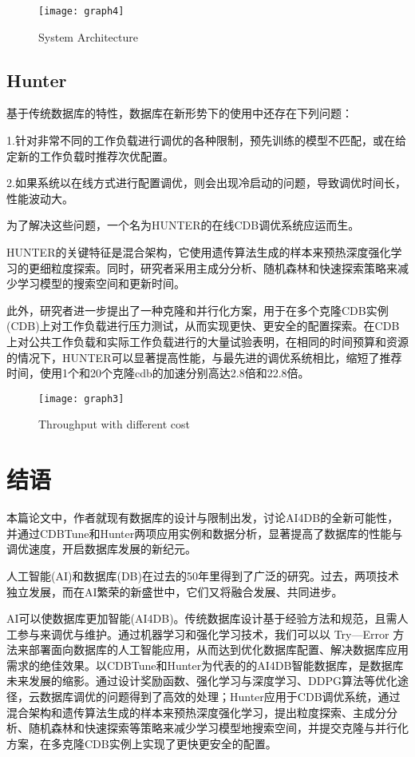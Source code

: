 \documentclass[a4paper,12pt]{article}
\begin{document}
\begin{figure}
\centering
\texttt{[image: graph4]}
\caption{System Architecture\cite{05}}
\end{figure}
\subsection{Hunter}
基于传统数据库的特性，数据库在新形势下的使用中还存在下列问题：

1.针对非常不同的工作负载进行调优的各种限制，预先训练的模型不匹配，或在给定新的工作负载时推荐次优配置。

2.如果系统以在线方式进行配置调优，则会出现冷启动的问题，导致调优时间长，性能波动大。

为了解决这些问题，一个名为HUNTER的在线CDB调优系统应运而生。

HUNTER的关键特征是混合架构，它使用遗传算法生成的样本来预热深度强化学习的更细粒度探索。同时，研究者采用主成分分析、随机森林和快速探索策略来减少学习模型的搜索空间和更新时间。

此外，研究者进一步提出了一种克隆和并行化方案，用于在多个克隆CDB实例(CDB)上对工作负载进行压力测试，从而实现更快、更安全的配置探索。在CDB上对公共工作负载和实际工作负载进行的大量试验表明，在相同的时间预算和资源的情况下，HUNTER可以显著提高性能，与最先进的调优系统相比，缩短了推荐时间，使用1个和20个克隆cdb的加速分别高达2.8倍和22.8倍\cite{04}。

\begin{figure}
\centering
\texttt{[image: graph3]}
\caption{Throughput with different cost\cite{04}}
\end{figure}

\section{结语}
本篇论文中，作者就现有数据库的设计与限制出发，讨论AI4DB的全新可能性，并通过CDBTune和Hunter两项应用实例和数据分析，显著提高了数据库的性能与调优速度，开启数据库发展的新纪元。

人工智能(AI)和数据库(DB)在过去的50年里得到了广泛的研究。过去，两项技术独立发展，而在AI繁荣的新盛世中，它们又将融合发展、共同进步。

AI可以使数据库更加智能(AI4DB)。传统数据库设计基于经验方法和规范，且需人工参与来调优与维护。通过机器学习和强化学习技术，我们可以以 Try—Error 方法来部署面向数据库的人工智能应用，从而达到优化数据库配置、解决数据库应用需求的绝佳效果。以CDBTune和Hunter为代表的的AI4DB智能数据库，是数据库未来发展的缩影。通过设计奖励函数、强化学习与深度学习、DDPG算法等优化途径，云数据库调优的问题得到了高效的处理；Hunter应用于CDB调优系统，通过混合架构和遗传算法生成的样本来预热深度强化学习，提出粒度探索、主成分分析、随机森林和快速探索等策略来减少学习模型地搜索空间，并提交克隆与并行化方案，在多克隆CDB实例上实现了更快更安全的配置。
\end{document}

